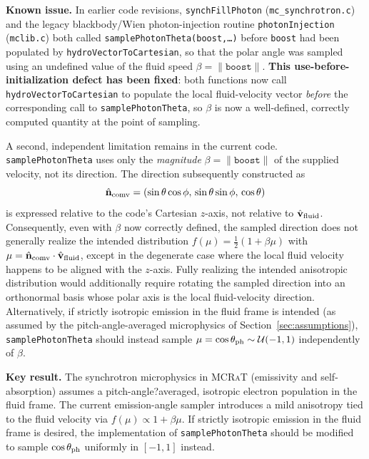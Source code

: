 \documentclass[12pt,a4paper]{article}
\newcommand{\code}[1]{\texttt{#1}}
\newcommand{\mcrat}{\textsc{MCRaT}}
\newenvironment{keyresult}{%
	\begin{framed}\noindent\textbf{Key result.}\quad}
	{\end{framed}}
\newenvironment{knownissue}{%
	\begin{framed}\noindent\textbf{Known issue.}\quad}
	{\end{framed}}
\begin{document}
\begin{knownissue}
	In earlier code revisions, \code{synchFillPhoton} (\code{mc\_synchrotron.c})
	and the legacy blackbody/Wien photon-injection routine
	\code{photonInjection} (\code{mclib.c}) both called
	\code{samplePhotonTheta(boost,\ldots)} before \code{boost} had been
	populated by \code{hydroVectorToCartesian}, so that the polar angle
	was sampled using an undefined value of the fluid speed
	$\beta=\|\code{boost}\|$. \textbf{This use-before-initialization
		defect has been fixed}: both functions now call
	\code{hydroVectorToCartesian} to populate the local fluid-velocity
	vector \emph{before} the corresponding call to
	\code{samplePhotonTheta}, so $\beta$ is now a well-defined, correctly
	computed quantity at the point of sampling.
	
	A second, independent limitation remains in the current code.
	\code{samplePhotonTheta} uses only the \emph{magnitude}
	$\beta=\|\code{boost}\|$ of the supplied velocity, not its direction.
	The direction subsequently constructed as
	\begin{equation}
		\hat{\mathbf n}_{\rm comv}
		=
		\left(
		\sin\theta\cos\phi,\,
		\sin\theta\sin\phi,\,
		\cos\theta
		\right)
	\end{equation}
	is expressed relative to the code's Cartesian $z$-axis, not relative
	to $\hat{\mathbf v}_{\rm fluid}$. Consequently, even with $\beta$ now
	correctly defined, the sampled direction does not generally realize
	the intended distribution $f(\mu)=\tfrac12(1+\beta\mu)$ with
	$\mu=\hat{\mathbf n}_{\rm comv}\cdot\hat{\mathbf v}_{\rm fluid}$,
	except in the degenerate case where the local fluid velocity happens
	to be aligned with the $z$-axis. Fully realizing the intended
	anisotropic distribution would additionally require rotating the
	sampled direction into an orthonormal basis whose polar axis is the
	local fluid-velocity direction. Alternatively, if strictly isotropic
	emission in the fluid frame is intended (as assumed by the
	pitch-angle-averaged microphysics of
	Section~\ref{sec:assumptions}), \code{samplePhotonTheta} should
	instead sample $\mu=\cos\theta_{\rm ph}\sim\mathcal U(-1,1)$
	independently of $\beta$.
\end{knownissue}

\begin{keyresult}
	The synchrotron microphysics in \mcrat{} (emissivity and self-absorption)
	assumes a pitch-angle?averaged, isotropic electron population in the
	fluid frame. The current emission-angle sampler introduces a mild
	anisotropy tied to the fluid velocity via \(f(\mu)\propto 1+\beta\mu\).
	If strictly isotropic emission in the fluid frame is desired, the
	implementation of \code{samplePhotonTheta} should be modified to sample
	\(\cos\theta_{\rm ph}\) uniformly in \([-1,1]\) instead.
\end{keyresult}
\end{document}
